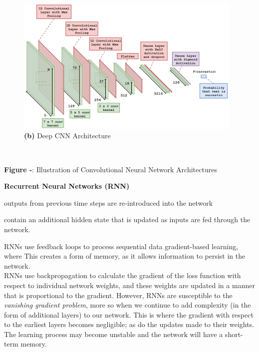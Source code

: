\documentclass[12pt,a4paper]{article}
\begin{document}
\begin{minipage}{0.6\textwidth}
	\begin{figure}[H]
		\includegraphics[width=0.97\textwidth]{Images/DCNNarchNew.png}
		\centering\textbf{(b)} Deep CNN Architecture\\
	\end{figure}
\end{minipage}\\\vspace{-7pt}

\begin{center}
	\textbf{Figure -}: Illustration of Convolutional Neural Network Architectures
\end{center}

\noindent \textbf{Recurrent Neural Networks (RNN)} 


outputs from previous time steps are re-introduced into the network

contain an additional hidden state that is updated as inputs are fed through the network.

RNNs use feedback loops to process sequential data
gradient-based learning, where 
This creates a form of memory, as it allows information to persist in the network.\\

\noindent RNNs use backpropagation to calculate the gradient of the loss function with respect to individual network weights, and these weights are updated in a manner that is proportional to the gradient. However, RNNs are susceptible to the \textit{vanishing gradient problem}, more so when we continue to add complexity (in the form of additional layers) to our network. This is where the gradient with respect to the earliest layers becomes negligible; as do the updates made to their weights. The learning process may become unstable and the network will have a short-term memory.\\
\end{document}
